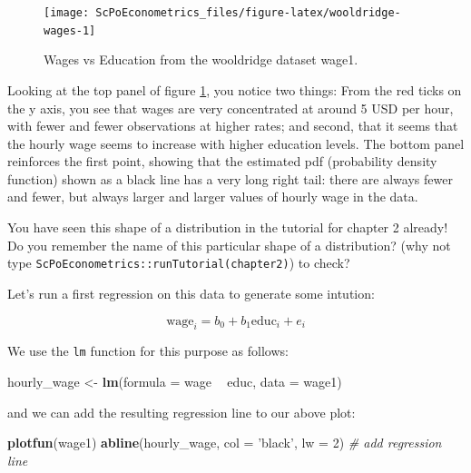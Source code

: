\documentclass[]{book}
\newenvironment{Shaded}{\begin{snugshade}}{\end{snugshade}}
\newcommand{\CommentTok}[1]{\textcolor[rgb]{0.56,0.35,0.01}{\textit{#1}}}
\newcommand{\DataTypeTok}[1]{\textcolor[rgb]{0.13,0.29,0.53}{#1}}
\newcommand{\DecValTok}[1]{\textcolor[rgb]{0.00,0.00,0.81}{#1}}
\newcommand{\KeywordTok}[1]{\textcolor[rgb]{0.13,0.29,0.53}{\textbf{#1}}}
\newcommand{\NormalTok}[1]{#1}
\newcommand{\OperatorTok}[1]{\textcolor[rgb]{0.81,0.36,0.00}{\textbf{#1}}}
\newcommand{\StringTok}[1]{\textcolor[rgb]{0.31,0.60,0.02}{#1}}
\newenvironment{warning}{\begin{tcolorbox}[colback=orange!5!white,colframe=orange]}{\end{tcolorbox}}
\begin{document}
\begin{figure}

{\centering \texttt{[image: ScPoEconometrics\_files/figure-latex/wooldridge-wages-1]} 

}

\caption{Wages vs Education from the wooldridge dataset wage1.}\label{fig:wooldridge-wages}
\end{figure}

Looking at the top panel of figure \ref{fig:wooldridge-wages}, you notice two things: From the red ticks on the y axis, you see that wages are very concentrated at around 5 USD per hour, with fewer and fewer observations at higher rates; and second, that it seems that the hourly wage seems to increase with higher education levels. The bottom panel reinforces the first point, showing that the estimated pdf (probability density function) shown as a black line has a very long right tail: there are always fewer and fewer, but always larger and larger values of hourly wage in the data.

\begin{warning}
You have seen this shape of a distribution in the tutorial for chapter 2
already! Do you remember the name of this particular shape of a
distribution? (why not type
\texttt{ScPoEconometrics::runTutorial(\textquotesingle{}chapter2\textquotesingle{})})
to check?
\end{warning}

Let's run a first regression on this data to generate some intution:

\begin{equation}
\text{wage}_i = b_0 + b_1 \text{educ}_i + e_i \label{eq:wage}
\end{equation}

We use the \texttt{lm} function for this purpose as follows:

\begin{Shaded}
\begin{Highlighting}[]
\NormalTok{hourly_wage <-}\StringTok{ }\KeywordTok{lm}\NormalTok{(}\DataTypeTok{formula =}\NormalTok{ wage }\OperatorTok{~}\StringTok{ }\NormalTok{educ, }\DataTypeTok{data =}\NormalTok{ wage1)}
\end{Highlighting}
\end{Shaded}

and we can add the resulting regression line to our above plot:

\begin{Shaded}
\begin{Highlighting}[]
\KeywordTok{plotfun}\NormalTok{(wage1)}
\KeywordTok{abline}\NormalTok{(hourly_wage, }\DataTypeTok{col =} \StringTok{'black'}\NormalTok{, }\DataTypeTok{lw =} \DecValTok{2}\NormalTok{) }\CommentTok{# add regression line}
\end{Highlighting}
\end{Shaded}
\end{document}
